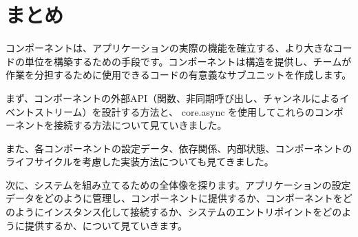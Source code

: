 \section{まとめ}

コンポーネントは、アプリケーションの実際の機能を確立する、より大きなコードの単位を構築するための手段です。コンポーネントは構造を提供し、チームが作業を分担するために使用できるコードの有意義なサブユニットを作成します。

まず、コンポーネントの外部API（関数、非同期呼び出し、チャンネルによるイベントストリーム）を設計する方法と、 core.async を使用してこれらのコンポーネントを接続する方法について見ていきました。

また、各コンポーネントの設定データ、依存関係、内部状態、コンポーネントのライフサイクルを考慮した実装方法についても見てきました。

次に、システムを組み立てるための全体像を探ります。アプリケーションの設定データをどのように管理し、コンポーネントに提供するか、コンポーネントをどのようにインスタンス化して接続するか、システムのエントリポイントをどのように提供するか、について見ていきます。